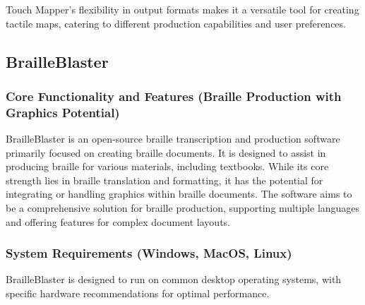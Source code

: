 Touch Mapper's flexibility in output formats makes it a versatile tool for creating tactile maps, catering to different production capabilities and user preferences.

\subsection{BrailleBlaster}

\subsubsection{Core Functionality and Features (Braille Production with Graphics Potential)}

BrailleBlaster is an open-source braille transcription and production software primarily focused on creating braille documents. It is designed to assist in producing braille for various materials, including textbooks. While its core strength lies in braille translation and formatting, it has the potential for integrating or handling graphics within braille documents. The software aims to be a comprehensive solution for braille production, supporting multiple languages and offering features for complex document layouts.

\subsubsection{System Requirements (Windows, MacOS, Linux)}

BrailleBlaster is designed to run on common desktop operating systems, with specific hardware recommendations for optimal performance.

